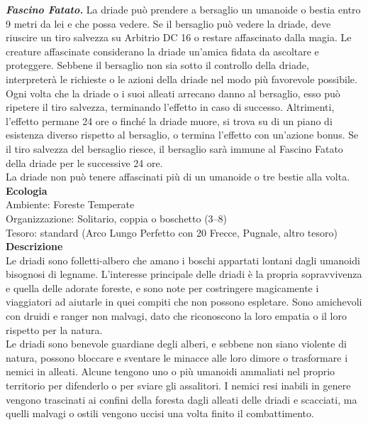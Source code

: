 \begin{multicols}{2}
\emph{\textbf{Fascino Fatato.}} La driade può prendere a bersaglio un umanoide o bestia entro 9 metri da lei e che possa vedere. Se il bersaglio può vedere la driade, deve riuscire un tiro salvezza su Arbitrio DC  16 o restare affascinato dalla magia. Le creature affascinate considerano la driade un'amica fidata da ascoltare e proteggere. Sebbene il bersaglio non sia sotto il controllo della driade, interpreterà le richieste o le azioni della driade nel modo più favorevole possibile.\\
Ogni volta che la driade o i suoi alleati arrecano danno al bersaglio, esso può ripetere il tiro salvezza, terminando l'effetto in caso di successo. Altrimenti, l'effetto permane 24 ore o finché la driade muore, si trova su di un piano di esistenza diverso rispetto al bersaglio, o termina l'effetto con un'azione bonus. Se il tiro salvezza del bersaglio riesce, il bersaglio sarà immune al Fascino Fatato della driade per le successive 24 ore.\\
La driade non può tenere affascinati più di un umanoide o tre bestie alla volta.\\
\textbf{Ecologia}\\
Ambiente: Foreste Temperate\\
Organizzazione: Solitario, coppia o boschetto (3–8)\\
Tesoro: standard (Arco Lungo Perfetto con 20 Frecce, Pugnale, altro tesoro)\\
\textbf{Descrizione}\\
Le driadi sono folletti-albero che amano i boschi appartati lontani dagli umanoidi bisognosi di legname. L’interesse principale delle driadi è la propria sopravvivenza e quella delle adorate foreste, e sono note per costringere magicamente i viaggiatori ad aiutarle in quei compiti che non possono espletare. Sono amichevoli con druidi e ranger non malvagi, dato che riconoscono la loro empatia o il loro rispetto per la natura.\\
Le driadi sono benevole guardiane degli alberi, e sebbene non siano violente di natura, possono bloccare e sventare le minacce alle loro dimore o trasformare i nemici in alleati. Alcune tengono uno o più umanoidi ammaliati nel proprio territorio per difenderlo o per sviare gli assalitori. I nemici resi inabili in genere vengono trascinati ai confini della foresta dagli alleati delle driadi e scacciati, ma quelli malvagi o ostili vengono uccisi una volta finito il combattimento.\\


\end{multicols}
